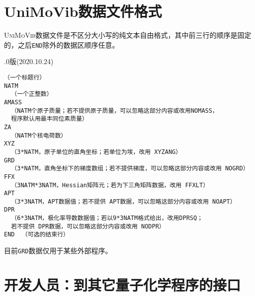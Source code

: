 \documentclass[12pt,a4paper,openany,twoside,cap,UTF8]{ctexbook}
\begin{document}
\section{UniMoVib数据文件格式} \label{sec:almfmt}

\textsc{UniMoVib}数据文件是不区分大小写的纯文本自由格式，其中前三行的顺序是固定的，之后\verb|END|除外的数据区顺序任意。

.0版(2020.10.24)
\begin{colorboxed}[oval=false,boxcolor=blue!75!black,bgcolor=blue!5!white]
\ttfamily
\begin{lstlisting}
（一个标题行）
NATM
  （一个正整数）
AMASS
  （NATM个原子质量；若不提供原子质量，可以忽略这部分内容或改用NOMASS，
  程序默认用最丰同位素质量）
ZA
  （NATM个核电荷数）
XYZ
  （3*NATM，原子单位的直角坐标；若单位为埃，改用 XYZANG）
GRD
  （3*NATM，直角坐标下的梯度数组；若不提供梯度，可以忽略这部分内容或改用 NOGRD）
FFX
  （3NATM*3NATM，Hessian矩阵元；若为下三角矩阵数据，改用 FFXLT）
APT
  （3*3NATM，APT数据值；若不提供 APT数据，可以忽略这部分内容或改用 NOAPT）
DPR
  （6*3NATM，极化率导数数据值；若以9*3NATM格式给出，改用DPRSQ；
  若不提供 DPR数据，可以忽略这部分内容或改用 NODPR）
END  （可选的结束行）
\end{lstlisting}\end{colorboxed}
目前\verb|GRD|数据仅用于某些外部程序。

\section{开发人员：到其它量子化学程序的接口} \label{sec:interface}
\end{document}

